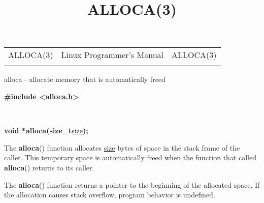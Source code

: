 \documentclass[]{article}
\title{ALLOCA(3)}
\author{}
\date{}
\let\realtextbf=\textbf
\renewcommand{\textbf}[1]{\textcolor{boldcolor}{\realtextbf{#1}}}
\renewcommand{\emph}[1]{\underline{#1}}
\begin{document}
\maketitle

\begin{longtable}[c]{@{}lll@{}}
\toprule\addlinespace
ALLOCA(3) & Linux Programmer's Manual & ALLOCA(3)
\\\addlinespace
\bottomrule
\end{longtable}


alloca - allocate memory that is automatically freed


\textbf{\#include \textless{}alloca.h\textgreater{}}

~

\textbf{void *alloca(size\_t}\emph{size}\textbf{);}


The \textbf{alloca}() function allocates \emph{size} bytes of space in
the stack frame of the caller. This temporary space is automatically
freed when the function that called \textbf{alloca}() returns to its
caller.


The \textbf{alloca}() function returns a pointer to the beginning of the
allocated space. If the allocation causes stack overflow, program
behavior is undefined.

\end{document}
